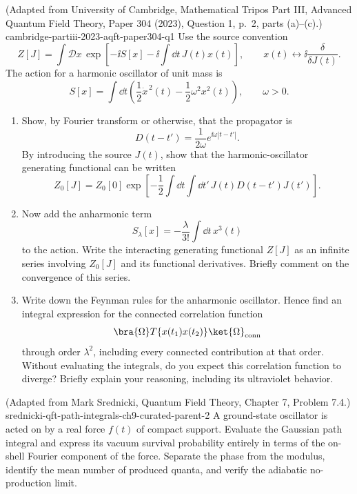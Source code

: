 \begin{enumerate}
  {(Adapted from University of Cambridge, Mathematical Tripos Part III,
  Advanced Quantum Field Theory, Paper 304 (2023), Question 1, p.~2,
  parts (a)--(c).)}
  {cambridge-partiii-2023-aqft-paper304-q1}
Use the source convention
\[
 Z[J]=\int\mathcal D x\,
 \exp\left[-\ii S[x]-\ii\int \dd t\,J(t)x(t)\right],
 \qquad
 x(t)\longleftrightarrow \ii\frac{\delta}{\delta J(t)}.
\]
The action for a harmonic oscillator of unit mass is
\[
 S[x]=\int \dd t\left(\frac12\dot x^{\,2}(t)
 -\frac12\omega^2x^2(t)\right),
 \qquad \omega>0.
\]
\begin{enumerate}
\item
Show, by Fourier transform or otherwise, that the propagator is
\[
 D(t-t')=\frac{1}{2\omega}e^{\ii\omega|t-t'|}.
\]
By introducing the source \(J(t)\), show that the harmonic-oscillator
generating functional can be written
\[
 Z_0[J]=Z_0[0]\exp\left[-\frac12\int \dd t\int \dd t'\,
 J(t)D(t-t')J(t')\right].
\]
\item
Now add the anharmonic term
\[
 S_\lambda[x]=-\frac{\lambda}{3!}\int \dd t\,x^3(t)
\]
to the action.  Write the interacting generating functional \(Z[J]\) as an
infinite series involving \(Z_0[J]\) and its functional derivatives.  Briefly
comment on the convergence of this series.
\item
Write down the Feynman rules for the anharmonic oscillator.  Hence find an
integral expression for the connected correlation function
\[
 \bra{\Omega}T\{x(t_1)x(t_2)\}\ket{\Omega}_{\rm conn}
\]
through order \(\lambda^2\), including every connected contribution at that
order.  Without evaluating the integrals, do you expect this correlation
function to diverge?  Briefly explain your reasoning, including its
ultraviolet behavior.
\end{enumerate}

  {(Adapted from Mark Srednicki, Quantum Field Theory, Chapter 7, Problem 7.4.)}
  {srednicki-qft-path-integrals-ch9-curated-parent-2}
A ground-state oscillator is acted on by a real force \(f(t)\) of compact
support.  Evaluate the Gaussian path integral and express its vacuum
survival probability entirely in terms of the on-shell Fourier component
of the force.  Separate the phase from the modulus, identify the mean number
of produced quanta, and verify the adiabatic no-production limit.


\end{enumerate}
